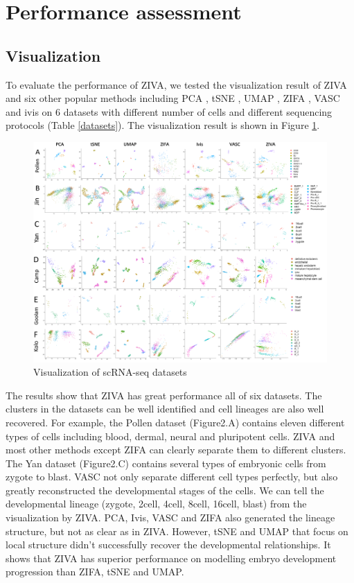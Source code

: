 \section{Performance assessment}
\subsection{Visualization}
To evaluate the performance of ZIVA, we tested the visualization result of ZIVA and six other popular methods including PCA \cite{Abdi2010}, tSNE \cite{maaten2008visualizing}, UMAP \cite{McInnes2018}, ZIFA \cite{Pierson2015}, VASC \cite{Wang2018} and ivis \cite{Szubert2019} on 6 datasets with different number of cells and different sequencing protocols (Table \ref{datasets}). The visualization result is shown in Figure \ref{vis}.
\begin{figure}[htb!]
    \centering
    \includegraphics[width=1\textwidth]{figures/myfigures/visualizations.png}
    \caption{Visualization of scRNA-seq datasets}
    \label{vis}
\end{figure}
The results show that ZIVA has great performance all of six datasets. The clusters in the datasets can be well identified and cell lineages are also well recovered. For example, the Pollen dataset (Figure2.A) contains eleven different types of cells including blood, dermal, neural and pluripotent cells. ZIVA and most other methods except ZIFA can clearly separate them to different clusters. \\
The Yan dataset (Figure2.C) contains several types of embryonic cells from zygote to blast. VASC not only separate different cell types perfectly, but also greatly reconstructed the developmental stages of the cells. We can tell the developmental lineage (zygote, 2cell, 4cell, 8cell, 16cell, blast) from the visualization by ZIVA. PCA, Ivis, VASC and ZIFA also generated the lineage structure, but not as clear as in ZIVA. However, tSNE and UMAP that focus on local structure didn’t successfully recover the developmental relationships. It shows that ZIVA has superior performance on modelling embryo development progression than ZIFA, tSNE and UMAP. \\
